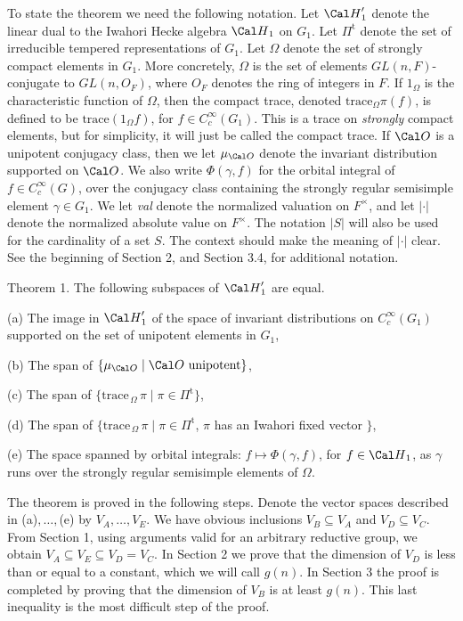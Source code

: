 To state the theorem we need the following notation.
Let ${\Cal H}_1'$ denote the linear dual to the Iwahori Hecke algebra 
${\Cal H}_1$  on $G_1$.  Let $\Pi^{\text{t}}$ denote the set of irreducible
tempered representations of $G_1$. Let $\Omega$ denote the set
of strongly compact elements in $G_1$.  More concretely, $\Omega$
is the set of elements $GL(n,F)$-conjugate to $GL(n,O_F)$, where
$O_F$ denotes the ring of integers in $F$.  
If $1_\Omega$ is the characteristic function
of $\Omega$, then the compact trace, denoted 
$\text{trace}_\Omega\pi(f) $, is defined to be $\text{trace}
(1_\Omega f)$, for $f\in C_c^\infty(G_1)$.  
This is a trace on {\it strongly} compact elements, but for simplicity, it
will just be called the compact trace.
If ${\Cal O}$ is a unipotent
conjugacy class, then we let $\mu_{\Cal O}$ denote the invariant distribution
supported on ${\Cal O}$.  We also write $\Phi(\gamma,f)$ for the
orbital integral of $f\in C_c^\infty(G)$, over the conjugacy class
containing the strongly regular
semisimple element $\gamma\in G_1$.  
We let {\sl val} denote the normalized valuation on $F^\times$, and let $|\cdot|$
denote the normalized absolute value on $F^\times$.  The notation $|S|$ will also be
used for the cardinality of a set $S$.  The context should make the meaning of
$|\cdot|$ clear.
See the beginning of Section 2, and
Section 3.4, for additional notation.

\bigskip
\proclaim Theorem 1.  
  The following subspaces of 
  $ {\Cal H}_1' $ are equal.
\item{{\rm (a)}}
  The image in 
    $ {\Cal H}_1' $
  of the space of invariant distributions on
    $ C_c^{\infty}  (G_1) $
  supported on the set of unipotent elements in $G_1$,
\item{{\rm (b)}}
  The span of 
    $ \{ \mu_{\Cal O} \mid \Cal O \text{ unipotent}\} $,
\item{{\rm (c)}}
  The span of 
    $ \{ \text{trace}_{\,\Omega}\,\pi \mid
         \pi \in \Pi^{\text{t}} \} $,
\item{{\rm (d)}} 
  The span of
    $ \{ \text{trace}_{\,\Omega}\,\pi \mid
         \pi \in \Pi^{\text{t}} $, 
    $ \pi $
    has an Iwahori fixed vector $\}$,
\item{{\rm (e)}}
  The space spanned by orbital integrals:
    $ f \mapsto \Phi (\gamma, f) $, for
    $ f \in {\Cal H}_1 $,
  as $\gamma$ runs over the strongly regular semisimple
  elements of 
  $ \Omega $.
\finishproclaim

\medskip
\noindent
The theorem is proved in the following steps.
Denote the vector spaces described in (a)$,\dots,$(e) by
  $ V_A,\ldots,V_E$.
We have obvious inclusions
  $ V_B \subseteq V_A$ and $V_D \subseteq V_C $.
From Section 1, using arguments valid for an arbitrary
  reductive group, we obtain
  $ V_A \subseteq V_E \subseteq V_D = V_C $.
In Section 2 we prove that the dimension of $V_D$ is less than or
equal to a constant, which we will call $g(n)$.
In Section 3 the proof is completed by proving that the dimension
of $V_B$ is at least $g(n)$.
This last inequality is the most difficult step of the proof.

